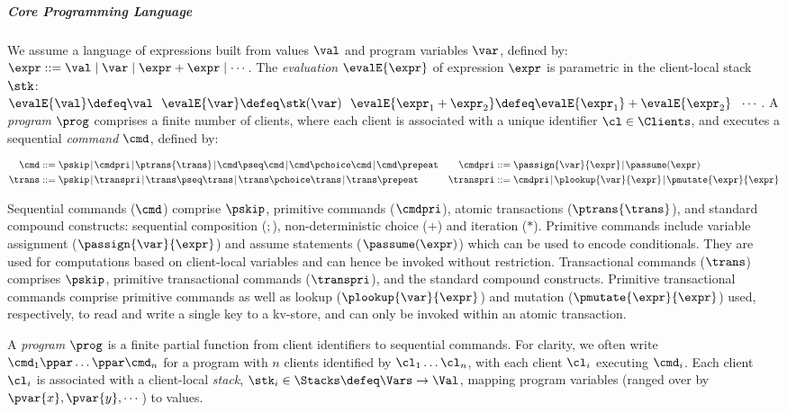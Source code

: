 \subparagraph*{Core Programming Language}
We assume a language of expressions built from values \( \val \)
and program variables \( \var \), defined by:
\(\expr ::= \val \mid \var \mid \expr + \expr \mid \cdots\).
The \emph{evaluation} \(\evalE{\expr}\) of expression \(\expr\) is parametric in
the client-local stack \( \stk \):
\(
\evalE{\val} \defeq
\val
\ \
\evalE{\var} \defeq
\stk(\var)
\ \
\evalE{\expr_{1} + \expr_{2}} \defeq
\evalE{\expr_{1}} + \evalE{\expr_{2}}
\ \
\cdots 
\).
A \emph{program} \( \prog \) comprises a finite number of clients,
where each client is associated with a unique identifier \( \cl \in \Clients \), 
and executes a sequential \emph{command} \(\cmd\), defined by:

\SpaceAboveMath
\begin{align*}
\cmd & ::=  
\pskip \!\mid\!
\cmdpri \!\mid\!  
\ptrans{\trans} \!\mid\! 
\cmd \pseq \cmd \!\mid\! 
\cmd \pchoice \cmd \!\mid\! 
\cmd \prepeat
&
 \cmdpri& ::=  
\passign{\var}{\expr} \!\mid\! 
\passume(\expr)
\\
\trans & ::=
\pskip \!\mid\!
\transpri \!\mid\! 
\trans \pseq \trans \!\mid\!
\trans \pchoice \trans \!\mid\!
\trans\prepeat    
&
\transpri & ::= 
\cmdpri \!\mid\!
\plookup{\var}{\expr} \!\mid\!
\pmutate{\expr}{\expr} 
\end{align*}
\SpaceBelowMath
 
\noindent
Sequential commands (\(\cmd\)) comprise \(\pskip\), primitive commands
(\(\cmdpri\)), atomic transactions (\(\ptrans{\trans}\)), and standard
compound constructs: sequential composition (\( ; \)), non-deterministic
choice (\( + \)) and iteration (\( * \)). 
Primitive commands include variable assignment
(\(\passign{\var}{\expr}\)) and assume statements (\(\passume(\expr)\))
which can be used to encode conditionals. They are used for computations based on client-local variables and can hence be invoked
without restriction.  Transactional commands (\(\trans\)) comprises
\(\pskip\), primitive transactional commands (\(\transpri\)), and the
standard compound constructs.  Primitive transactional commands comprise
primitive commands as well as lookup (\(\plookup{\var}{\expr}\)) and mutation
(\(\pmutate{\expr}{\expr}\)) used, respectively, to read and write a
single key to a  kv-store, and can only be invoked within an atomic
transaction.


A \emph{program} \( \prog \) is a finite partial function from client identifiers to sequential
commands.
For clarity, we often write \( \cmd_{1}\ppar \dots \ppar \cmd_{n}\) for a program with \(n\) clients identified by
\(\cl_1 \dots \cl_n\), with each client \(\cl_i\) executing \(\cmd_i\). 
Each client \(\cl_i\) is associated with a client-local \emph{stack}, 
\(\stk_i \in \Stacks \defeq \Vars \to \Val\),  mapping program variables
(ranged over by \(\pvar{x}, \pvar{y}, \cdots\))
to values. 

